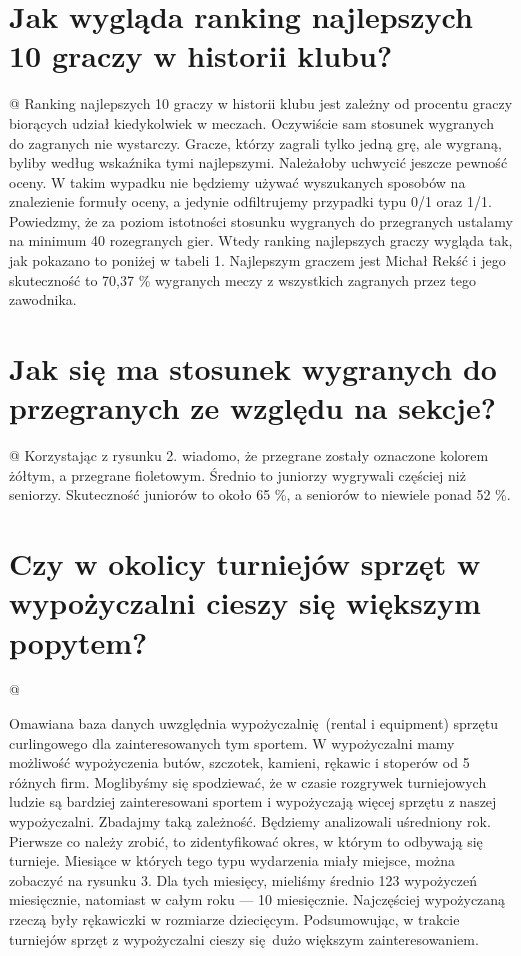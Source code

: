 \documentclass{mwart}\usepackage[]{graphicx}\usepackage[]{xcolor}
\begin{document}
\section{Jak wygląda ranking najlepszych 10 graczy w historii klubu?}

@
Ranking najlepszych 10 graczy w historii klubu jest zależny od procentu graczy biorących udział kiedykolwiek w meczach. Oczywiście sam stosunek wygranych do zagranych nie wystarczy. Gracze, którzy zagrali tylko jedną grę, ale wygraną, byliby według wskaźnika tymi najlepszymi. Należałoby uchwycić jeszcze pewność oceny. W takim wypadku nie będziemy używać wyszukanych sposobów na znalezienie formuły oceny, a jedynie odfiltrujemy przypadki typu 0/1 oraz 1/1. Powiedzmy, że za poziom istotności stosunku wygranych do przegranych ustalamy na minimum 40 rozegranych gier. Wtedy ranking najlepszych graczy wygląda tak, jak pokazano to poniżej w tabeli 1. Najlepszym graczem jest Michał Rekść i jego skuteczność to 70,37 \% wygranych meczy z wszystkich zagranych przez tego zawodnika.

\section{Jak się ma stosunek wygranych do przegranych ze względu na sekcje?}
@
Korzystając z rysunku 2. wiadomo, że przegrane zostały oznaczone kolorem żółtym, a przegrane fioletowym. Średnio to juniorzy wygrywali częściej niż seniorzy. Skuteczność juniorów to około 65 \%, a seniorów to niewiele ponad 52 \%.


\section{Czy w okolicy turniejów sprzęt w wypożyczalni cieszy się większym popytem?}

@

Omawiana baza danych uwzględnia wypożyczalnię (rental i equipment) sprzętu curlingowego dla zainteresowanych tym sportem. W wypożyczalni mamy możliwość wypożyczenia butów, szczotek, kamieni, rękawic i stoperów od 5 różnych firm. Moglibyśmy się spodziewać, że w czasie rozgrywek turniejowych ludzie są bardziej zainteresowani sportem i wypożyczają więcej sprzętu z naszej wypożyczalni. Zbadajmy taką zależność. Będziemy analizowali uśredniony rok. Pierwsze co należy zrobić, to zidentyfikować okres, w którym to odbywają się turnieje. Miesiące w których tego typu wydarzenia miały miejsce, można zobaczyć na rysunku 3. Dla tych miesięcy, mieliśmy średnio 123 wypożyczeń miesięcznie, natomiast w całym roku — 10 miesięcznie. Najczęściej wypożyczaną rzeczą były rękawiczki w rozmiarze dziecięcym. Podsumowując, w trakcie turniejów sprzęt z wypożyczalni cieszy się dużo większym zainteresowaniem.
\end{document}
